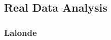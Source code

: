 \documentclass[11pt]{article}
\newcommand{\bX}{{\boldsymbol X}}
\newcommand{\bY}{{\boldsymbol Y}}
\newcommand{\bZ}{{\boldsymbol Z}}
\newcommand{\be}{{\boldsymbol e}}
\newcommand{\bw}{{\boldsymbol w}}
\newcommand{\mK}{\mathcal{K}}
\newcommand{\btheta}{{\boldsymbol \theta}}
\begin{document}
    

    
 



  
  



\subsection{Real Data Analysis}
\subsubsection{Lalonde}
\end{document}
